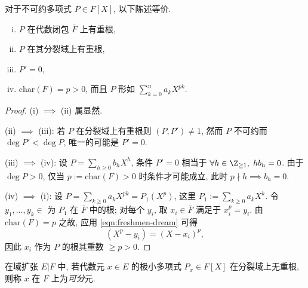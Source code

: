 \begin{theorem}\label{prop:separable-polynomial}
	对于不可约多项式 $P \in F[X]$, 以下陈述等价.
	\begin{enumerate}[(i)]
		\item $P$ 在代数闭包 $\overline{F}$ 上有重根,
		\item $P$ 在其分裂域上有重根,
		\item $P'=0$,
		\item $\mathrm{char}(F)=p > 0$, 而且 $P$ 形如 $\sum_{k=0}^n a_k X^{pk}$.
	\end{enumerate}
\end{theorem}
\begin{proof}
	(i) $\implies$ (ii) 属显然.

	(ii) $\implies$ (iii): 若 $P$ 在分裂域上有重根则 $(P,P') \neq 1$, 然而 $P$ 不可约而 $\deg P' < \deg P$, 唯一的可能是 $P'=0$.
	
	(iii) $\implies$ (iv): 设 $P = \sum_{h \geq 0} b_h X^h$, 条件 $P'=0$ 相当于 $\forall h \in \Z_{\geq 1},\; h b_h = 0$. 由于 $\deg P > 0$, 仅当 $p := \text{char}(F) > 0$ 时条件才可能成立, 此时 $p \nmid h \implies b_h = 0$. %
	
	(iv) $\implies$ (i): 设 $P = \sum_{k \geq 0} a_k X^{pk} = P_1(X^p)$, 这里 $P_1 := \sum_{k \geq 0} a_k X^k$. 令 $y_1, \ldots, y_k \in $ 为 $P_1$ 在 $\overline{F}$ 中的根; 对每个 $y_i$, 取 $x_i \in \overline{F}$ 满足于 $x_i^p = y_i$. 由 $\text{char}(F)=p$ 之故, 应用 \eqref{eqn:freshmen-dream} 可得
	\[ (X^p-y_i) =  (X-x_i)^p, \]
	因此 $x_i$ 作为 $P$ 的根其重数 $\geq p > 0$.
\end{proof}

\begin{definition}[可分元]
	在域扩张 $E|F$ 中, 若代数元 $x \in E$ 的极小多项式 $P_x \in F[X]$ 在分裂域上无重根, 则称 $x$ 在 $F$ 上为\emph{可分}元.
\end{definition}

